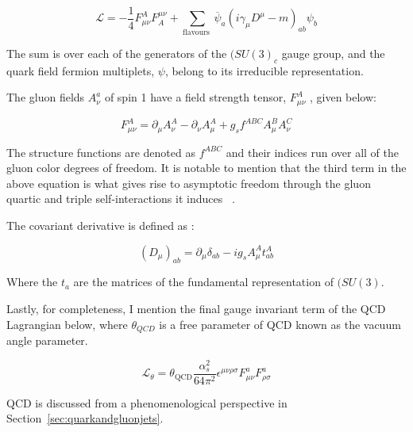 \begin{equation}
\mathcal{L}=-\frac{1}{4} F_{\mu \nu}^{A} F_{A}^{\mu \nu}+\sum_{\text {flavours }} \overline{\psi}_{a}\left(i \gamma_{\mu} D^{\mu}-m\right)_{a b} \psi_{b}
\end{equation}


The sum is over each of the generators of the $(SU(3)_c$ gauge group, and the quark field fermion multiplets, $\psi$, belong to its irreducible representation.~\cite{Crewther:1995wq}

The gluon fields $A_{\nu}^a$ of spin 1 have a field strength tensor, $F_{\mu \nu}^{A}$ , given below:\newline 

\begin{equation}
F_{\mu \nu}^{A}=\partial_{\mu} A_{\nu}^{A}-\partial_{\nu} A_{\mu}^{A}+g_{s} f^{A B C} A_{\mu}^{B} A_{\nu}^{C}
\end{equation}


The structure functions are denoted as $f^{A B C}$ and their indices run over all of the gluon color degrees of freedom. It is notable to mention that the third term in the above equation is what gives rise to asymptotic freedom through the gluon quartic and triple self-interactions it induces ~\cite{Crewther:1995wq}.

The covariant derivative is defined as :\newline

\begin{equation}
\left(D_{\mu}\right)_{a b}=\partial_{\mu} \delta_{a b}-i g_{s} A_{\mu}^{A} t_{a b}^{A}
\end{equation}

Where the $t_{a}$ are the matrices of the fundamental representation of $(SU(3)$.

Lastly, for completeness, I mention the final gauge invariant term of the QCD Lagrangian below, where $\theta_{QCD}$ is a free parameter of QCD known as the vacuum angle parameter.

\begin{equation}
\mathcal{L}_{\theta}=\theta_{\mathrm{QCD}} \frac{\alpha_{s}^{2}}{64 \pi^{2}} \epsilon^{\mu \nu \rho \sigma} F_{\mu \nu}^{a} F_{\rho \sigma}^{a}
\end{equation}


QCD is discussed from a phenomenological perspective in Section~\ref{sec:quarkandgluonjets}. 













